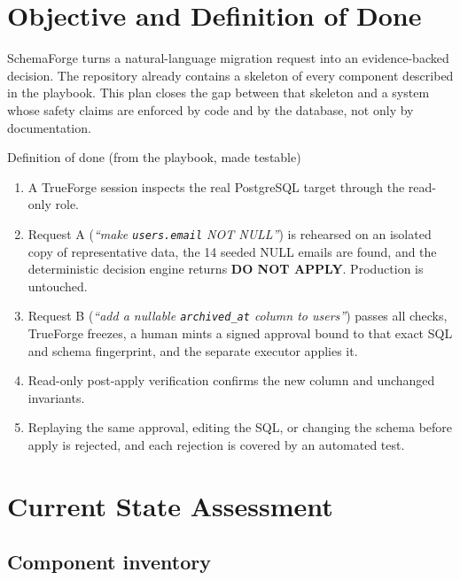 \documentclass[11pt,a4paper]{article}
\newcommand{\fp}[1]{\nolinkurl{#1}}  %
\begin{document}
\tableofcontents
\newpage

\section{Objective and Definition of Done}

SchemaForge turns a natural-language migration request into an evidence-backed
decision. The repository already contains a skeleton of every component described in
the playbook. This plan closes the gap between that skeleton and a system whose safety
claims are enforced by code and by the database, not only by documentation.

\begin{keybox}{Definition of done (from the playbook, made testable)}
\begin{enumerate}[leftmargin=*]
  \item A TrueForge session inspects the real PostgreSQL target through the read-only role.
  \item Request A (\emph{``make \fp{users.email} NOT NULL''}) is rehearsed on an isolated
        copy of representative data, the 14 seeded NULL emails are found, and the
        deterministic decision engine returns \textbf{DO NOT APPLY}. Production is untouched.
  \item Request B (\emph{``add a nullable \fp{archived_at} column to users''}) passes all checks, TrueForge
        freezes, a human mints a signed approval bound to that exact SQL and schema
        fingerprint, and the separate executor applies it.
  \item Read-only post-apply verification confirms the new column and unchanged invariants.
  \item Replaying the same approval, editing the SQL, or changing the schema before apply
        is rejected, and each rejection is covered by an automated test.
\end{enumerate}
\end{keybox}

\section{Current State Assessment}

\subsection{Component inventory}
\end{document}
